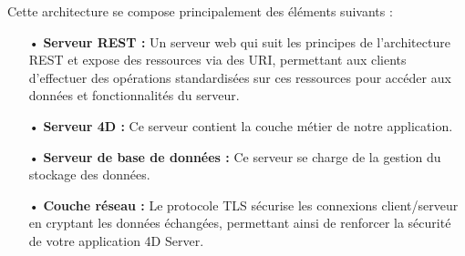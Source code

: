 Cette architecture se compose principalement des éléments suivants :
\begin{itemize}
   \item[•] \textbf{Serveur REST :} Un serveur web qui suit les principes de l’architecture REST et expose des ressources via des URI, permettant aux clients d’effectuer des opérations standardisées sur ces ressources pour accéder aux données et fonctionnalités du serveur.
   \item[•] \textbf{Serveur 4D :} Ce serveur contient la couche métier de notre application.
   \item[•] \textbf{Serveur de base de données :} Ce serveur se charge de la gestion du stockage des données.
   \item[•] \textbf{Couche réseau :} Le protocole TLS sécurise les connexions client/serveur en cryptant les données échangées, permettant ainsi de renforcer la sécurité de votre application 4D Server.
\end{itemize}

